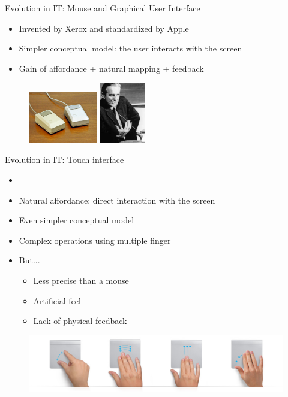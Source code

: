 \documentclass{beamer}
\begin{document}
\begin{frame}{Evolution in IT: Mouse and Graphical User Interface}
\begin{itemize}
\item Invented by Xerox and standardized by Apple
\item Simpler conceptual model: the user interacts with the screen
\item Gain of affordance + natural mapping + feedback
\end{itemize}

\begin{figure}
\raggedleft
	   \begin{minipage}{5cm}
				  \includegraphics[width=3cm]{mice.jpg}
			  \end{minipage}
			  	   \begin{minipage}{5cm}
				  \includegraphics[width=2cm]{doug.jpg}
			  \end{minipage}
\end{figure}
\end{frame}

\begin{frame}{Evolution in IT: Touch interface}
\begin{itemize}
\item
\item Natural affordance: direct interaction with the screen
\item Even simpler conceptual model
\item Complex operations using multiple finger
\item But...
    \begin{itemize}
        \item Less precise than a mouse
        \item Artificial feel
        \item Lack of physical feedback
    \end{itemize}
\end{itemize}
\begin{figure}[ht]
\includegraphics[scale=0.3]{multitouch_gestures_trackpad_2.jpg}
\end{figure}
\end{frame}
\end{document}
